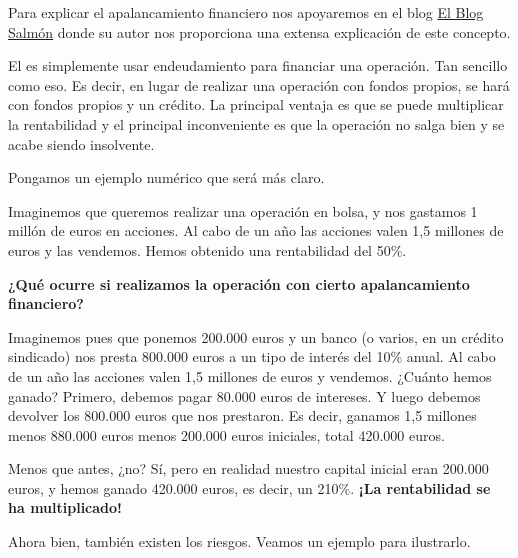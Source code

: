 \documentclass[nochap,palatino,shortheader]{apuntes}
\newcommand{\study}[1]{#1} \newcommand{\substudy}[1]{#1}
\begin{document}
Para explicar el apalancamiento financiero nos apoyaremos en el blog \href{http://www.elblogsalmon.com/conceptos-de-economia/que-es-el-apalancamiento-financiero}{El Blog Salmón} donde su autor nos proporciona una extensa explicación de este concepto.

El  es simplemente \study{usar endeudamiento para financiar una operación}. Tan sencillo como eso. Es decir, en lugar de realizar una operación con fondos propios, se hará con fondos propios y un crédito. La principal \substudy{ventaja} es que se puede \substudy{multiplicar} la \substudy{rentabilidad} y el principal \substudy{inconveniente} es que la operación no salga bien y se \substudy{acabe siendo insolvente}.

Pongamos un ejemplo numérico que será más claro.

\begin{example}
Imaginemos que queremos realizar una operación en bolsa, y nos gastamos 1 millón de euros en acciones. Al cabo de un año las acciones valen 1,5 millones de euros y las vendemos. Hemos obtenido una rentabilidad del 50\%.

\textbf{¿Qué ocurre si realizamos la operación con cierto apalancamiento financiero?}

Imaginemos pues que ponemos 200.000 euros y un banco (o varios, en un crédito sindicado) nos presta 800.000 euros a un tipo de interés del 10\% anual. Al cabo de un año las acciones valen 1,5 millones de euros y vendemos. ¿Cuánto hemos ganado? Primero, debemos pagar 80.000 euros de intereses. Y luego debemos devolver los 800.000 euros que nos prestaron. Es decir, ganamos 1,5 millones menos 880.000 euros menos 200.000 euros iniciales, total 420.000 euros.

Menos que antes, ¿no? Sí, pero en realidad nuestro capital inicial eran 200.000 euros, y hemos ganado 420.000 euros, es decir, un 210\%. \textbf{¡La rentabilidad se ha multiplicado!}
\end{example}

Ahora bien, también existen los riesgos. Veamos un ejemplo para ilustrarlo.
\end{document}
